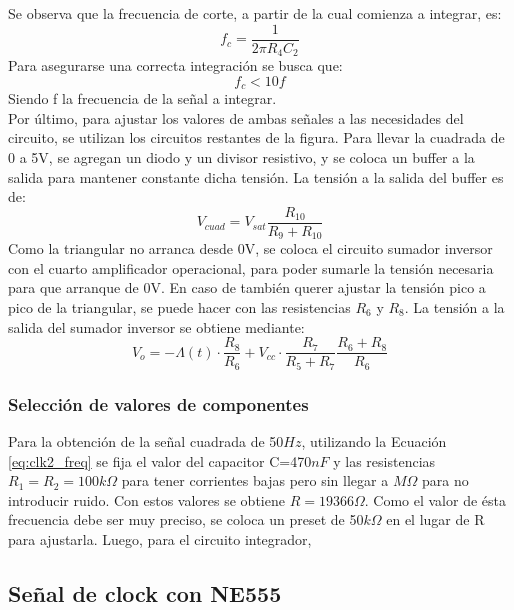 \documentclass[11pt, a4paper]{article}
\begin{document}
Se observa que la frecuencia de corte, a partir de la cual comienza a integrar, es:
\begin{equation}
    f_c = \frac{1}{2 \pi R_4 C_2}
\end{equation}
Para asegurarse una correcta integraci\'on se busca que: 
\begin{equation*}
    f_c < 10 f
\end{equation*}
Siendo f la frecuencia de la señal a integrar.\\
Por \'ultimo, para ajustar los valores de ambas señales a las necesidades del circuito, se utilizan los circuitos restantes de la figura. Para llevar la cuadrada de 0 a 5V, se agregan un diodo y un divisor resistivo, y se coloca un buffer a la salida para mantener constante dicha tensi\'on. La tensi\'on a la salida del buffer es de:
\begin{equation}
    V_{cuad} = V_{sat} \frac{R_{10}}{R_9 + R_{10}}
\end{equation}
Como la triangular no arranca desde 0V, se coloca el circuito sumador inversor con el cuarto amplificador operacional, para poder sumarle la tensi\'on necesaria para que arranque de 0V. En caso de tambi\'en querer ajustar la tensi\'on pico a pico de la triangular, se puede hacer con las resistencias $R_6$ y $R_8$. La tensi\'on a la salida del sumador inversor se obtiene mediante:
\begin{equation}
    V_o = - \Lambda(t) \cdot \frac{R_{8}}{R_{6}} + V_{cc}\cdot \frac{R_7}{R_5 + R_7} \frac{R_6 + R_8}{R_6} 
\end{equation}
%
\subsubsection{Selecci\'on de valores de componentes}
\noindent
Para la obtenci\'on de la señal cuadrada de 50$Hz$, utilizando la Ecuaci\'on \ref{eq:clk2_freq} se fija el valor del capacitor C=470$nF$ y las resistencias $R_1=R_2=100k\Omega$ para tener corrientes bajas pero sin llegar a $M\Omega$ para no introducir ruido. Con estos valores se obtiene $R=19366\Omega$. Como el valor de \'esta frecuencia debe ser muy preciso, se coloca un preset de 50$k\Omega$ en el lugar de R para ajustarla.\newline
Luego, para el circuito integrador, 
%
\subsection{Señal de clock con NE555}
%
\end{document}
